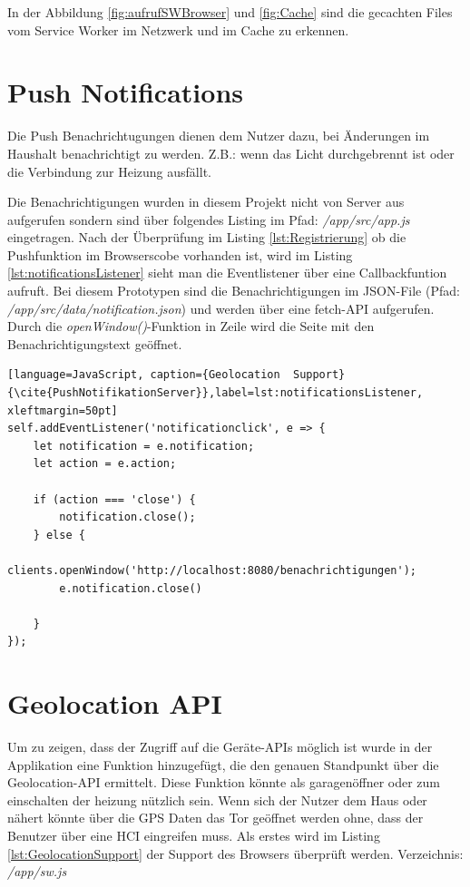 In der Abbildung \ref{fig:aufrufSWBrowser} und \ref{fig:Cache} sind die gecachten Files vom Service Worker im Netzwerk und im Cache zu erkennen.



\clearpage
\section{Push Notifications}
Die Push Benachrichtugungen dienen dem Nutzer dazu, bei Änderungen im Haushalt benachrichtigt zu werden. Z.B.: wenn das Licht durchgebrennt ist oder die Verbindung zur Heizung ausfällt.

Die Benachrichtigungen wurden in diesem Projekt nicht von Server aus aufgerufen sondern sind über folgendes Listing im Pfad: \textit{/app/src/app.js} eingetragen. 
Nach der Überprüfung im Listing \ref{lst:Registrierung} ob die Pushfunktion im Browserscobe vorhanden ist, wird im Listing \ref{lst:notificationsListener} sieht man die Eventlistener über eine Callbackfuntion aufruft. Bei diesem Prototypen sind die Benachrichtigungen im JSON-File (Pfad: \textit{/app/src/data/notification.json}) und werden über eine fetch-API aufgerufen. Durch die \textit{openWindow()}-Funktion in Zeile wird die Seite mit den Benachrichtigungstext geöffnet.  
\\
\begin{lstlisting}[language=JavaScript, caption={Geolocation  Support} {\cite{PushNotifikationServer}},label=lst:notificationsListener, xleftmargin=50pt]
self.addEventListener('notificationclick', e => {
    let notification = e.notification;
    let action = e.action;

    if (action === 'close') {
        notification.close();
    } else {
        clients.openWindow('http://localhost:8080/benachrichtigungen');
        e.notification.close()

    }
});
\end{lstlisting}
\clearpage

\section{Geolocation API}
Um zu zeigen, dass der Zugriff auf die Geräte-APIs möglich ist wurde in der Applikation eine Funktion hinzugefügt, die den genauen Standpunkt über die Geolocation-API ermittelt. Diese Funktion könnte als garagenöffner oder zum einschalten der heizung nützlich sein. Wenn sich der Nutzer dem Haus oder nähert könnte über die GPS Daten das Tor geöffnet werden ohne, dass der Benutzer über eine HCI eingreifen muss. 
Als erstes wird im Listing \ref{lst:GeolocationSupport} der Support des Browsers überprüft werden.
Verzeichnis: \textit{/app/sw.js}

